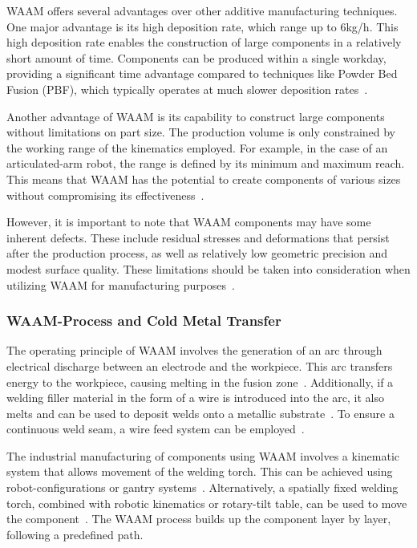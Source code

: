 WAAM offers several advantages over other additive manufacturing techniques. One major advantage is its high deposition rate, which range up to 6kg/h. This high deposition rate enables the construction of large components in a relatively short amount of time. Components can be produced within a single workday, providing a significant time advantage compared to techniques like Powder Bed Fusion (PBF), which typically operates at much slower deposition rates~\cite{IvanTabernero.2018}.

Another advantage of WAAM is its capability to construct large components without limitations on part size. The production volume is only constrained by the working range of the kinematics employed. For example, in the case of an articulated-arm robot, the range is defined by its minimum and maximum reach. This means that WAAM has the potential to create components of various sizes without compromising its effectiveness~\cite{Li.2019}.

However, it is important to note that WAAM components may have some inherent defects. These include residual stresses and deformations that persist after the production process, as well as relatively low geometric precision and modest surface quality. These limitations should be taken into consideration when utilizing WAAM for manufacturing purposes~\cite{Wu.2018}.

\subsubsection{WAAM-Process and Cold Metal Transfer}
The operating principle of WAAM involves the generation of an arc through electrical discharge between an electrode and the workpiece. This arc transfers energy to the workpiece, causing melting in the fusion zone~\cite{Ou.2018}. Additionally, if a welding filler material in the form of a wire is introduced into the arc, it also melts and can be used to deposit welds onto a metallic substrate~\cite{Cunningham.2018}. To ensure a continuous weld seam, a wire feed system can be employed~\cite{Ding.2015}.

The industrial manufacturing of components using WAAM involves a kinematic system that allows movement of the welding torch. This can be achieved using robot-configurations or gantry systems~\cite{Schmitz.2021}. Alternatively, a spatially fixed welding torch, combined with robotic kinematics or rotary-tilt table, can be used to move the component~\cite{Nagasai.2022}. The WAAM process builds up the component layer by layer, following a predefined path.

